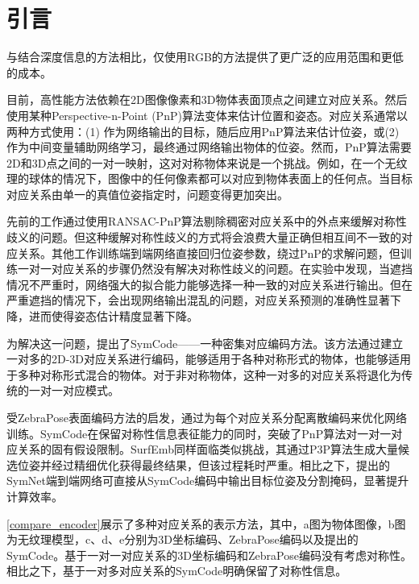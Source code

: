 \section{引言}
\par 与结合深度信息\cite{9191119, 9429889, 9933183, 9206072, 2024hipose}的方法相比，仅使用RGB的方法\cite{8765585, billings2019silhonet, hybridpose}提供了更广泛的应用范围和更低的成本。

目前，高性能方法\cite{wang2021gdr, su2022zebrapose}依赖在2D图像像素和3D物体表面顶点之间建立对应关系。然后使用某种Perspective-n-Point (PnP)算法\cite{EPnP}变体来估计位置和姿态。对应关系通常以两种方式使用：(1) 作为网络输出的目标\cite{su2022zebrapose}，随后应用PnP算法来估计位姿，或(2) 作为中间变量辅助网络学习，最终通过网络输出物体的位姿\cite{wang2021gdr}。然而，PnP算法需要2D和3D点之间的一对一映射，这对对称物体来说是一个挑战。例如，在一个无纹理的球体的情况下，图像中的任何像素都可以对应到物体表面上的任何点。当目标对应关系由单一的真值位姿指定时，问题变得更加突出。

先前的工作\cite{pvnet, park2019pix2pose, su2022zebrapose}通过使用RANSAC-PnP算法剔除稠密对应关系中的外点来缓解对称性歧义的问题。但这种缓解对称性歧义的方式将会浪费大量正确但相互间不一致的对应关系。其他工作\cite{wang2021gdr, di2021so}训练端到端网络直接回归位姿参数，绕过PnP的求解问题，但训练一对一对应关系的步骤仍然没有解决对称性歧义的问题。在实验中发现，当遮挡情况不严重时，网络强大的拟合能力能够选择一种一致的对应关系进行输出。但在严重遮挡的情况下，会出现网络输出混乱的问题，对应关系预测的准确性显著下降，进而使得姿态估计精度显著下降。

\par 为解决这一问题，提出了SymCode——一种密集对应编码方法。该方法通过建立一对多的2D-3D对应关系进行编码，能够适用于各种对称形式的物体，也能够适用于多种对称形式混合的物体。对于非对称物体，这种一对多的对应关系将退化为传统的一对一对应模式。

\par 受ZebraPose\cite{su2022zebrapose}表面编码方法的启发，通过为每个对应关系分配离散编码来优化网络训练。SymCode在保留对称性信息表征能力的同时，突破了PnP算法对一对一对应关系的固有假设限制。SurfEmb\cite{haugaard2022surfemb}同样面临类似挑战，其通过P3P算法生成大量候选位姿并经过精细优化获得最终结果，但该过程耗时严重。相比之下，提出的SymNet端到端网络可直接从SymCode编码中输出目标位姿及分割掩码，显著提升计算效率。

\par \autoref{compare_encoder}展示了多种对应关系的表示方法，其中，a图为物体图像，b图为无纹理模型，c、d、e分别为3D坐标编码、ZebraPose编码\cite{su2022zebrapose}以及提出的SymCode。基于一对一对应关系的3D坐标编码和ZebraPose编码没有考虑对称性。相比之下，基于一对多对应关系的SymCode明确保留了对称性信息。

